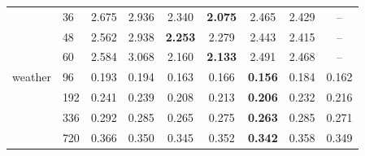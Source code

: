 {\begin{tabular}{llccccccc}
 & 36 & 2.675 & 2.936 & 2.340 & \textbf{2.075} & 2.465 & 2.429 & -- \\
 & 48 & 2.562 & 2.938 & \textbf{2.253} & 2.279 & 2.443 & 2.415 & -- \\
 & 60 & 2.584 & 3.068 & 2.160 & \textbf{2.133} & 2.491 & 2.468 & -- \\
weather & 96 & 0.193 & 0.194 & 0.163 & 0.166 & \textbf{0.156} & 0.184 & 0.162 \\
 & 192 & 0.241 & 0.239 & 0.208 & 0.213 & \textbf{0.206} & 0.232 & 0.216 \\
 & 336 & 0.292 & 0.285 & 0.265 & 0.275 & \textbf{0.263} & 0.285 & 0.271 \\
 & 720 & 0.366 & 0.350 & 0.345 & 0.352 & \textbf{0.342} & 0.358 & 0.349 \\
\bottomrule
\end{tabular}}
